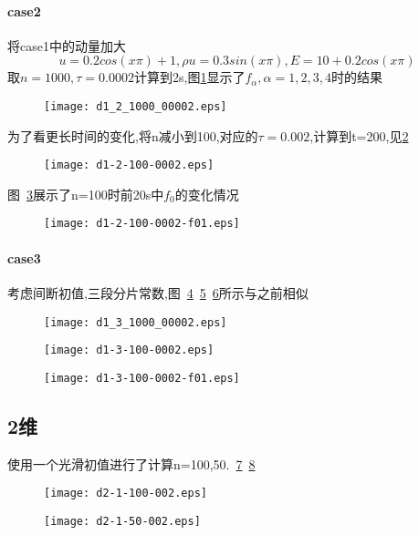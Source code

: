 \documentclass[UTF8]{ctexart}
\begin{document}
\paragraph{case2}
将case1中的动量加大
$$u=0.2cos(x\pi)+1,\rho u=0.3sin(x\pi),E=10+0.2cos(x\pi)$$
取$n=1000,\tau=0.0002$计算到2s,图\ref{fig:4}显示了$f_{\alpha},\alpha=1,2,3,4$时的结果
\begin{figure}[htbp]
\centering\texttt{[image: d1\_2\_1000\_00002.eps]}
\caption{}\label{fig:4}
\end{figure}
为了看更长时间的变化,将n减小到100,对应的$\tau=0.002$,计算到t=200,见\ref{fig:5}
\begin{figure}[htbp]
\centering\texttt{[image: d1-2-100-0002.eps]}
\caption{}\label{fig:5}
\end{figure}
图~\ref{fig:6}展示了n=100时前20s中$f_0$的变化情况
\begin{figure}[htbp]
\centering\texttt{[image: d1-2-100-0002-f01.eps]}
\caption{}\label{fig:6}
\end{figure}

\paragraph{case3}
考虑间断初值,三段分片常数,图~\ref{fig:7}~\ref{fig:8}~\ref{fig:9}所示与之前相似
\begin{figure}[htbp]
\centering\texttt{[image: d1\_3\_1000\_00002.eps]}
\caption{}\label{fig:7}
\end{figure}

\begin{figure}[htbp]
\centering\texttt{[image: d1-3-100-0002.eps]}
\caption{}\label{fig:8}
\end{figure}

\begin{figure}[htbp]
\centering\texttt{[image: d1-3-100-0002-f01.eps]}
\caption{}\label{fig:9}
\end{figure}

\subsection{2维}
使用一个光滑初值进行了计算n=100,50.~\ref{fig:10}~\ref{fig:100}
\begin{figure}[htbp]
\centering\texttt{[image: d2-1-100-002.eps]}
\caption{}\label{fig:10}
\end{figure}
\begin{figure}[htbp]
\centering\texttt{[image: d2-1-50-002.eps]}
\caption{}\label{fig:100}
\end{figure}
\end{document}
